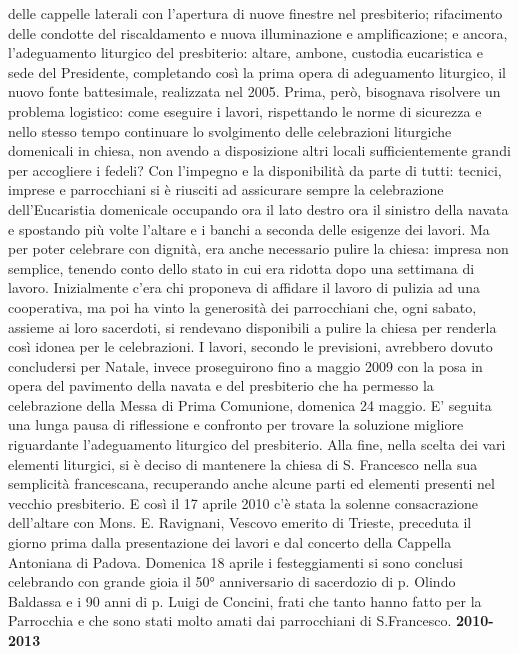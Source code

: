 delle cappelle laterali con l'apertura di nuove finestre nel presbiterio; rifacimento delle condotte del 
riscaldamento e nuova illuminazione e amplificazione; e ancora, l'adeguamento liturgico del 
presbiterio: altare, ambone, custodia eucaristica e sede del Presidente, completando così la prima 
opera di adeguamento liturgico, il nuovo fonte battesimale, realizzata nel 2005.
Prima, però, bisognava risolvere un problema logistico: come eseguire i lavori, rispettando le norme 
di sicurezza e nello stesso tempo continuare lo svolgimento delle celebrazioni liturgiche domenicali 
in chiesa, non avendo a disposizione altri locali sufficientemente grandi per accogliere i fedeli?
Con l'impegno e la disponibilità da parte di tutti: tecnici, imprese e parrocchiani si è riusciti ad 
assicurare sempre la celebrazione dell'Eucaristia domenicale occupando ora il lato destro ora il 
sinistro della navata e spostando più volte l'altare e i banchi a seconda delle esigenze dei lavori.
Ma per poter celebrare con dignità, era anche necessario pulire la chiesa: impresa non 
semplice, tenendo conto dello stato in cui era ridotta dopo una settimana di lavoro. 
Inizialmente c'era chi proponeva di affidare il lavoro di pulizia ad una cooperativa, ma poi ha vinto 
la generosità dei parrocchiani che, ogni sabato, assieme ai loro sacerdoti, si rendevano disponibili a 
pulire la chiesa per renderla così idonea per le celebrazioni.
I lavori, secondo le previsioni, avrebbero dovuto concludersi per Natale, invece 
proseguirono fino a maggio 2009 con la posa in opera del pavimento della navata e del presbiterio 
che ha permesso la celebrazione della Messa di Prima Comunione, domenica 24 maggio. 
E' seguita una lunga pausa di riflessione e confronto per trovare la soluzione migliore riguardante 
l'adeguamento liturgico del presbiterio. Alla fine, nella scelta dei vari elementi liturgici, si è deciso 
di mantenere la chiesa di S. Francesco nella sua semplicità francescana, recuperando anche alcune 
parti ed elementi presenti nel vecchio presbiterio.
E così il 17 aprile 2010 c'è stata la solenne consacrazione dell'altare con Mons. E. 
Ravignani, Vescovo emerito di Trieste, preceduta il giorno prima dalla presentazione dei lavori e 
dal concerto della Cappella Antoniana di Padova. 
Domenica 18 aprile i festeggiamenti si sono conclusi celebrando con grande gioia il 50° 
anniversario di sacerdozio di p. Olindo Baldassa e i 90 anni di p. Luigi de Concini, frati che tanto 
hanno fatto per la Parrocchia e che sono stati molto amati dai parrocchiani di S.Francesco.
\bigbreak
\textbf{2010-2013}
